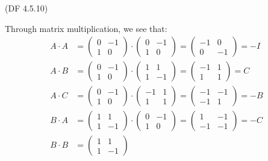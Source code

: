 \begin{problem}{(\textsf{DF 4.5.10})}
\begin{enumalph}
\begin{Answer}
        \noindent
        Through matrix multiplication, we see that:
        \begin{align*}
          A \cdot A &= \begin{pmatrix} 0 & -1 \\ 1 & 0 \end{pmatrix}
          \cdot \begin{pmatrix} 0 & -1 \\ 1 & 0 \end{pmatrix}
          = \begin{pmatrix} -1 & 0 \\ 0 & -1 \end{pmatrix} = -I \\
          A \cdot B &= \begin{pmatrix} 0 & -1 \\ 1 & 0 \end{pmatrix}
          \cdot \begin{pmatrix} 1 & 1 \\ 1 & -1 \end{pmatrix}
          = \begin{pmatrix} -1 & 1 \\ 1 & 1 \end{pmatrix} = C \\
          A \cdot C &= \begin{pmatrix} 0 & -1 \\ 1 & 0 \end{pmatrix}
          \cdot \begin{pmatrix} -1 & 1 \\ 1 & 1 \end{pmatrix}
          = \begin{pmatrix} -1 & -1 \\ -1 & 1 \end{pmatrix} = -B \\
          B \cdot A &= \begin{pmatrix} 1 & 1 \\ 1 & -1 \end{pmatrix}
          \cdot \begin{pmatrix} 0 & -1 \\ 1 & 0 \end{pmatrix}
          = \begin{pmatrix} 1 & -1 \\ -1 & -1 \end{pmatrix} = -C \\
          B \cdot B &= \begin{pmatrix} 1 & 1 \\ 1 & -1 \end{pmatrix}

\end{align*}
\end{Answer}
\end{enumalph}
\end{problem}
